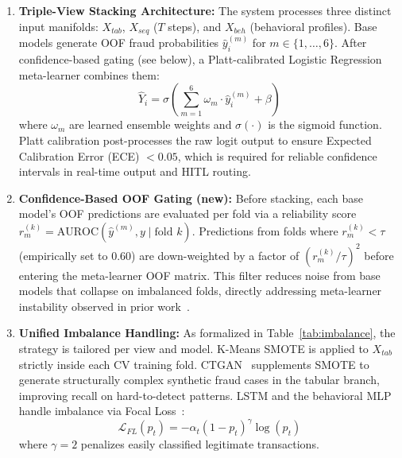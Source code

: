 \documentclass[10pt,a4paper,twocolumn]{article}
\begin{document}
\begin{enumerate}
    \item \textbf{Triple-View Stacking Architecture:} The system processes three distinct input manifolds: $X_{tab}$, $X_{seq}$ ($T$ steps), and $X_{beh}$ (behavioral profiles). Base models generate OOF fraud probabilities $\hat{y}_i^{(m)}$ for $m \in \{1,\dots,6\}$. After confidence-based gating (see below), a Platt-calibrated Logistic Regression meta-learner combines them:
    \begin{equation}
    \hat{Y}_i = \sigma \!\left( \sum_{m=1}^{6} \omega_m \cdot \hat{y}_i^{(m)} + \beta \right)
    \end{equation}
    where $\omega_m$ are learned ensemble weights and $\sigma(\cdot)$ is the sigmoid function. Platt calibration post-processes the raw logit output to ensure Expected Calibration Error (ECE) $< 0.05$, which is required for reliable confidence intervals in real-time output and HITL routing.

    \item \textbf{Confidence-Based OOF Gating (new):} Before stacking, each base model's OOF predictions are evaluated per fold via a reliability score $r_m^{(k)} = \text{AUROC}(\hat{y}^{(m)}, y \mid \text{fold } k)$. Predictions from folds where $r_m^{(k)} < \tau$ (empirically set to 0.60) are down-weighted by a factor of $(r_m^{(k)}/\tau)^2$ before entering the meta-learner OOF matrix. This filter reduces noise from base models that collapse on imbalanced folds, directly addressing meta-learner instability observed in prior work~\cite{chagahi2025}.

    \item \textbf{Unified Imbalance Handling:} As formalized in Table~\ref{tab:imbalance}, the strategy is tailored per view and model. K-Means SMOTE is applied to $X_{tab}$ strictly inside each CV training fold. CTGAN~\cite{xu2019} supplements SMOTE to generate structurally complex synthetic fraud cases in the tabular branch, improving recall on hard-to-detect patterns. LSTM and the behavioral MLP handle imbalance via Focal Loss~\cite{lin2017focal}:
    \begin{equation}
    \mathcal{L}_{FL}(p_t) = -\alpha_t (1 - p_t)^\gamma \log(p_t)
    \end{equation}
    where $\gamma{=}2$ penalizes easily classified legitimate transactions.


\end{enumerate}
\end{document}

